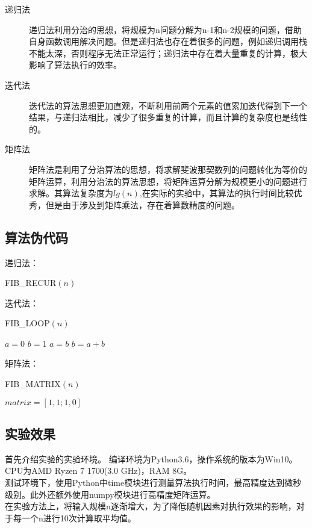 \documentclass[UTF8]{ctexart}
\begin{document}
\begin{description}
\item[递归法] 递归法利用分治的思想，将规模为n问题分解为n-1和n-2规模的问题，借助自身函数调用解决问题。但是递归法也存在着很多的问题，例如递归调用栈不能太深，否则程序无法正常运行；递归法中存在着大量重复的计算，极大影响了算法执行的效率。
\item[迭代法]
迭代法的算法思想更加直观，不断利用前两个元素的值累加迭代得到下一个结果，与递归法相比，减少了很多重复的计算，而且计算的复杂度也是线性的。
\item[矩阵法]
矩阵法是利用了分治算法的思想，将求解斐波那契数列的问题转化为等价的矩阵运算，利用分治法的算法思想，将矩阵运算分解为规模更小的问题进行求解。其算法复杂度为$lg(n)$,在实际的实验中，其算法的执行时间比较优秀，但是由于涉及到矩阵乘法，存在着算数精度的问题。
\end{description} 

\subsection{算法伪代码}

递归法：
\begin{algorithm}[H]
	\caption{FIB\_RECUR$(n)$}%
    \begin{algorithmic}[1]%
        \ENDIF
	\end{algorithmic}
\end{algorithm}

迭代法：
\begin{algorithm}[H]
	\caption{FIB\_LOOP$(n)$}%
	\begin{algorithmic}[1]%
        \STATE $a = 0$
        \STATE $b = 1$
		\STATE $a = b$
		\STATE $b = a + b$
        \ENDFOR
	\end{algorithmic}
\end{algorithm}

矩阵法：
\begin{algorithm}[H]
	\caption{FIB\_MATRIX$(n)$}%
	\begin{algorithmic}[1]%
		\STATE $matrix = [1,1 ; 1,0]$
	\end{algorithmic}
\end{algorithm}


\subsection{实验效果}
首先介绍实验的实验环境。
编译环境为Python3.6，操作系统的版本为Win10。
CPU为AMD Ryzen 7 1700(3.0 GHz)，RAM 8G。\\
测试环境下，使用Python中time模块进行测量算法执行时间，最高精度达到微秒级别。此外还额外使用numpy模块进行高精度矩阵运算。\\
在实验方法上，将输入规模n逐渐增大，为了降低随机因素对执行效果的影响，对于每一个n进行10次计算取平均值。\\
\end{document}
